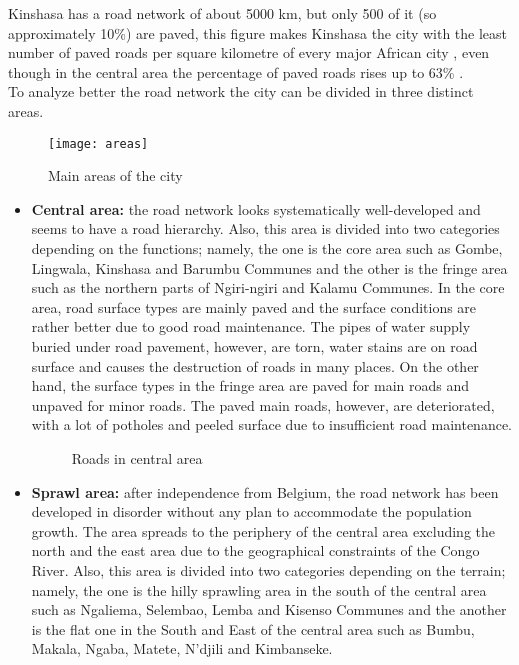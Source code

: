 \documentclass{article}
\begin{document}
Kinshasa has a road network of about 5000 km, but only 500 of it (so approximately 10\%) are paved, this figure makes Kinshasa the city with the least number of paved roads  per square kilometre of every major African city \cite{africatransport}, even though in the central area the percentage of paved roads rises up to 63\% \cite{japan}.\\
To analyze better the road network the city can be divided in three distinct areas.
\begin{figure}[H]
\centering
\texttt{[image: areas]}
\caption{Main areas of the city \cite{japan}}
\end{figure}
\begin{itemize}
\item{\textbf{Central area:}
the road network looks systematically well-developed and seems to have a road hierarchy. Also, this area is divided into two categories depending on the functions; namely, the one is the core area such as Gombe, Lingwala, Kinshasa and Barumbu Communes and the other is the fringe area such as the northern parts of Ngiri-ngiri and Kalamu Communes. 
In the core area, road surface types are mainly paved and the surface conditions are rather better due to good road maintenance. 
The pipes of water supply buried under road pavement, however, are torn, water stains are on road surface and causes the destruction of roads in many places.  
On the other hand, the surface types in the fringe area are paved for main roads and unpaved for minor roads. The paved main roads, however, are deteriorated, with a lot of potholes and peeled surface due to insufficient road maintenance.
\begin{figure}[H]
\qquad
{}
\caption{Roads in central area \cite{japan}}
\end{figure}}
\item{\textbf{Sprawl area:}
after independence from Belgium, the road network has been developed in disorder without any plan to accommodate the population growth. The area spreads to the periphery of the central area excluding the north and the east area due to the geographical constraints of the Congo River. Also, this area is divided into two categories depending on the terrain; namely, the one is the hilly sprawling area in the south of the central area such as Ngaliema, Selembao, Lemba and Kisenso Communes and the another is the flat one in the South and East of the central area such as Bumbu, Makala, Ngaba, Matete, N’djili and Kimbanseke.\\
}
\end{itemize}
\end{document}
